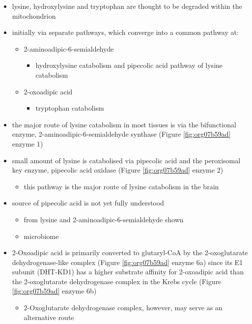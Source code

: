 \documentclass{scrartcl}
\begin{document}
\begin{itemize}
\item lysine, hydroxylysine and tryptophan are thought to be degraded
within the mitochondrion
\item initially via separate pathways, which converge into a common 
pathway at:
\begin{itemize}
\item 2-aminoadipic-6-semialdehyde
\begin{itemize}
\item hydroxylysine catabolism and pipecolic acid pathway of lysine
catabolism
\end{itemize}
\item 2-oxoadipic acid
\begin{itemize}
\item tryptophan catabolism
\end{itemize}
\end{itemize}
\item the major route of lysine catabolism in most tissues is via the
bifunctional enzyme, 2-aminoadipic-6-semialdehyde synthase (Figure \ref{fig:org07b59ad} enzyme 1)
\item small amount of lysine is catabolised via pipecolic acid and the
peroxisomal key enzyme, pipecolic acid oxidase (Figure \ref{fig:org07b59ad} enzyme 2)
\begin{itemize}
\item this pathway is the major route of lysine catabolism in the
brain
\end{itemize}
\item source of pipecolic acid is not yet fully understood
\begin{itemize}
\item from lysine and 2-aminoadipic-6-semialdehyde shown
\item microbiome
\end{itemize}

\item 2-Oxoadipic acid is primarily converted to glutaryl-CoA by the
2-oxoglutarate dehydrogenase-like complex (Figure \ref{fig:org07b59ad} enzyme 6a)
since its E1 subunit (DHT-KD1) has a higher substrate affinity for
2-oxoadipic acid than the 2-oxoglutarate dehydrogenase complex in
the Krebs cycle (Figure \ref{fig:org07b59ad} enzyme 6b)

\begin{itemize}
\item 2-Oxoglutarate dehydrogenase complex, however, may serve as an
alternative route


\end{itemize}
\end{itemize}
\end{document}
